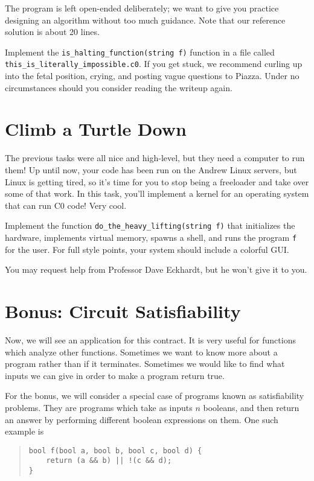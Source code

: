 \documentclass[12pt]{exam}
\begin{document}
The program is left open-ended deliberately; we want to give you practice designing an algorithm without too much guidance. Note that our reference solution is about 20 lines.

\begin{task}[10] Implement the \texttt{is\_halting\_function(string f)} function in a file called \texttt{this\_is\_literally\_impossible.c0}. If you get stuck, we recommend curling up into the fetal position, crying, and posting vague questions to Piazza. Under no circumstances should you consider reading the writeup again.
\end{task}

\section{Climb a Turtle Down}

The previous tasks were all nice and high-level, but they need a computer to run them! Up until now, your code has been run on the Andrew Linux servers, but Linux is getting tired, so it's time for you to stop being a freeloader and take over some of that work. In this task, you'll implement a kernel for an operating system that can run C0 code! Very cool.

\begin{task}[15] Implement the function \texttt{do\_the\_heavy\_lifting(string f)} that initializes the hardware, implements virtual memory, spawns a shell, and runs the program \texttt{f} for the user. For full style points, your system should include a colorful GUI.
\end{task}

You may request help from Professor Dave Eckhardt, but he won't give it to you.

\section{Bonus: Circuit Satisfiability}

Now, we will see an application for this contract. It is very useful for functions which analyze other functions. Sometimes we want to know more about a program rather than if it terminates. Sometimes we would like to find what inputs we can give in order to make a program return true.

For the bonus, we will consider a special case of programs known as satisfiability problems. They are programs which take as inputs $n$ booleans, and then return an answer by performing different boolean expressions on them. One such example is
\begin{quote}
\begin{lstlisting}[language={[coin]C}]
bool f(bool a, bool b, bool c, bool d) {
    return (a && b) || !(c && d);
}
\end{lstlisting}
\end{quote}
\end{document}
